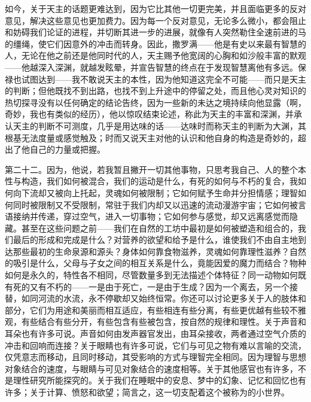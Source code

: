 如今，关于天主的话题更难达到，因为它比其他一切更完美，并且面临更多的反对意见，解决这些意见也更加费力。因为每一个反对意见，无论多么微小，都会阻止和妨碍我们论证的进程，并切断其进一步的进展，就像有人突然勒住全速前进的马的缰绳，使它们因意外的冲击而转身。因此，撒罗满——他是有史以来最有智慧的人，无论在他之前还是他同时代的人，天主赐予他宽阔的心胸和如沙般丰富的默观——他越深入深渊，就越发眩晕，并宣告智慧的终点在于发现智慧离他有多远。保禄也试图达到——我不敢说天主的本性，因为他知道这完全不可能——而只是天主的判断；但他既找不到出路，也找不到上升途中的停留之处，而且他心灵对知识的热切探寻没有以任何确定的结论告终，因为一些新的未达之境持续向他显露（啊，奇妙，我也有类似的经历），他以惊叹结束论述，称此为天主的丰富和深渊，并承认天主的判断不可测度，几乎是用达味的话——达味时而称天主的判断为大渊，其根基无法度量或感觉触及；时而又说天主对他的认识和他自身的构造是奇妙的，超出了他自己的力量或把握。\par

第二十二。因为，他说，若我暂且撇开一切其他事物，只思考我自己、人的整个本性与构造，我们如何被混合，我们的运动是什么，有死的如何与不朽的复合，我如何向下流却又被向上托起，灵魂如何被限制；它如何赋予生命并分担情感；理智如何同时被限制又不受限制，常驻于我们内却又以迅速的流动漫游宇宙；它如何被言语接纳并传递，穿过空气，进入一切事物；它如何参与感觉，却又远离感觉而隐藏。甚至在这些问题之前——我们在自然的工坊中最初是如何被塑造和组合的，我们最后的形成和完成是什么？对营养的欲望和给予是什么，谁使我们不由自主地到达那些最初的生命泉源和源头？身体如何靠食物滋养，灵魂如何靠理性滋养？自然的吸引是什么，父母与子女之间的相互关系是什么，竟能因爱的魔力而结合？物种如何是永久的，特性各不相同，尽管数量多到无法描述个体特征？同一动物如何既有死的又有不朽的——一是由于死亡，一是由于生成？因为一个离去，另一个接替，如同河流的水流，永不停歇却又始终恒常。你还可以讨论更多关于人的肢体和部分，它们为用途和美丽而相互适应，有些相连有些分离，有些更优越有些较不雅观，有些结合有些分开，有些包含有些被包含，按自然的规律和理性。关于声音和耳朵也有许多可说。声音如何由发声器官发出，由耳朵接收，两者通过空气介质的冲击和回响而连接？关于眼睛也有许多可说，它们与可见之物有难以言喻的交流，仅凭意志而移动，且同时移动，其受影响的方式与理智完全相同。因为理智与思想对象结合的速度，与眼睛与可见对象结合的速度相等。关于其他感官也有许多，不是理性研究所能探究的。关于我们在睡眠中的安息、梦中的幻象、记忆和回忆也有许多；关于计算、愤怒和欲望；简言之，这一切支配着这个被称为的小世界。\par

